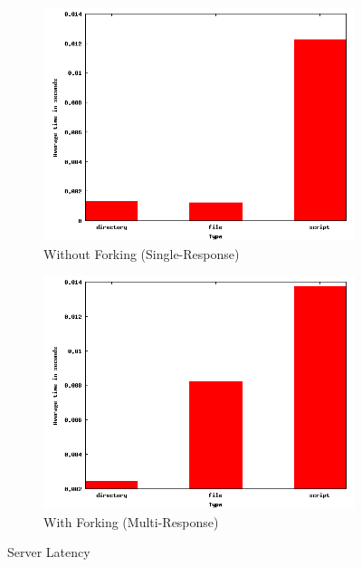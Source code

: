 \documentclass{article}
\begin{document}
\begin{figure}[H]
    \centering
    \begin{subfigure}{.5\textwidth}
        \centering
        \includegraphics[scale=0.18]{latency.png}
        \caption{Without Forking (Single-Response)}
        \label{fig:1.1}
    \end{subfigure}%
    \begin{subfigure}{.5\textwidth}
         \centering
        \includegraphics[scale=0.18]{latencywithfork.png}
        \caption{With Forking (Multi-Response)}
        \label{fig:1.2}
    \end{subfigure}%
    \caption{Server Latency}
    \label{fig:1}
\end{figure}
\end{document}
